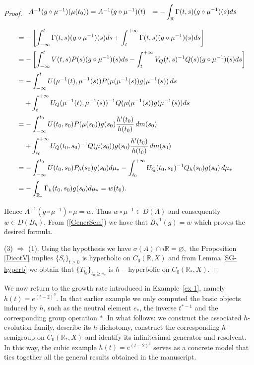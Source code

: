 \documentclass[10pt]{amsart}
\numberwithin{equation}{section}
\begin{document}
\begin{proof}
$
\begin{array}{rl}
\medskip
A^{-1}(g \circ \mu^{-1})(\mu(t_0)) = A^{-1}(g \circ \mu^{-1})(t) & = \displaystyle- \int_{\mathbb{R}} \Gamma(t,s) (g \circ \mu^{-1})(s) ds\\
\end{array}
$
$$
\begin{array}{rl}
     \medskip
     & =  \displaystyle- \left[ \int_{-\infty}^t \Gamma(t,s)(g \circ \mu^{-1})(s) ds + \int_{t}^{+\infty} \Gamma(t,s)(g \circ \mu^{-1})(s) ds \right]\\
     \medskip
& =  \displaystyle- \left[ \int_{-\infty}^t V(t,s)P(s)(g \circ \mu^{-1})(s) ds - \int_{t}^{+\infty} V_Q(t,s)^{-1} Q(s) (g \circ \mu^{-1})(s) ds \right]\\
\medskip
& =  \displaystyle- \int_{-\infty}^t U(\mu^{-1}(t),\mu^{-1}(s))P(\mu(\mu^{-1}(s)) g(\mu^{-1}(s)) \, ds \\
\medskip
& \quad \displaystyle + \int_{t}^{+\infty} U_Q(\mu^{-1}(t),\mu^{-1}(s))^{-1} Q(\mu(\mu^{-1}(s)) g(\mu^{-1}(s)) ds \\
\medskip
& =  \displaystyle- \int_{-\infty}^{t_0} U(t_0,s_0)P(\mu(s_0)) g(s_0) \frac{h'(t_0)}{h(t_0)}\, dm(s_0) \\
\medskip
& \quad \displaystyle + \int_{t_0}^{+\infty} U_Q(t_0,s_0)^{-1} Q(\mu(s_0)) g(s_0)\frac{h'(t_0)}{h(t_0)}\, dm(s_0) \\
\medskip
& =  \displaystyle- \int_{-\infty}^{t_0} U(t_0,s_0)P_h(s_0) g(s_0) d\mu_*  
\displaystyle - \int_{t_0}^{+\infty} U_Q(t_0,s_0)^{-1} Q_h(s_0) g(s_0)\, d\mu_* \\
\medskip
& = \displaystyle - \int_{\mathbb{R}_*} \Gamma_h(t_0,s_0) g(s_0) d\mu_* = w(t_0).
     \end{array}
$$
Hence $A^{-1}(g \circ \mu^{-1}) \circ \mu = w$. Thus $w \circ \mu^{-1} \in D(A)$ and consequently $w \in D(B_h).$ From (\ref{GenerSem}) we have that $B_h^{-1}(g) = w$ which proves the desired formula.  

\medskip

(3) $\Rightarrow$ (1). Using the hypothesis we have $\sigma(A) \cap i\mathbb{R} = \varnothing,$ the Proposition \ref{DicotV} implies $\{ S_t\}_{t \ge 0 }$ is hyperbolic on $C_0(\mathbb{R},X)$ and from  Lemma \ref{SG-hyperb} we obtain that 
$\{ T_{t_0}\}_{t_0 \ge e_* }$ is $h-$hyperbolic on $C_0(\mathbb{R}_*,X).$

\end{proof}


We now return to the growth rate introduced in Example~\ref{ex 1}, namely
$h(t)=e^{(t-2)^3}$. In that earlier example we only computed the basic objects
induced by $h$, such as the neutral element $e_*$, the inverse $t^{*-1}$ and the
corresponding group operation $*$. In what follows: we construct the associated $h$-evolution family,
describe its $h$-dichotomy, construct the corresponding $h$-semigroup on 
$C_0(\mathbb{R}_*,X)$ and identify its infinitesimal generator and resolvent.
In this way, the cubic example $h(t)=e^{(t-2)^3}$ serves as a concrete model that 
ties together all the general results obtained in the manuscript.
\end{document}
